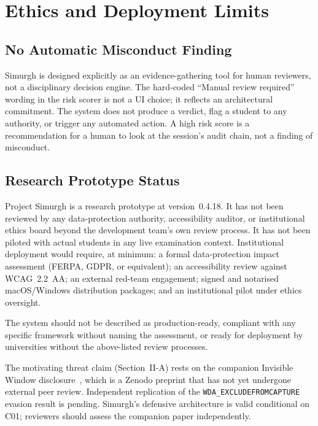 \documentclass[conference]{IEEEtran}
\begin{document}
\section{Ethics and Deployment Limits}

\subsection{No Automatic Misconduct Finding}

Simurgh is designed explicitly as an evidence-gathering tool for human reviewers, not a disciplinary decision engine. The hard-coded ``Manual review required'' wording in the risk scorer is not a UI choice; it reflects an architectural commitment. The system does not produce a verdict, flag a student to any authority, or trigger any automated action. A high risk score is a recommendation for a human to look at the session's audit chain, not a finding of misconduct.

\subsection{Research Prototype Status}

Project Simurgh is a research prototype at version~0.4.18. It has not been reviewed by any data-protection authority, accessibility auditor, or institutional ethics board beyond the development team's own review process. It has not been piloted with actual students in any live examination context. Institutional deployment would require, at minimum: a formal data-protection impact assessment (FERPA, GDPR, or equivalent); an accessibility review against WCAG~2.2~AA; an external red-team engagement; signed and notarised macOS/Windows distribution packages; and an institutional pilot under ethics oversight.

The system should not be described as production-ready, compliant with any specific framework without naming the assessment, or ready for deployment by universities without the above-listed review processes.

The motivating threat claim (Section~II-A) rests on the companion Invisible Window disclosure~\cite{abedini2026invisible}, which is a Zenodo preprint that has not yet undergone external peer review. Independent replication of the \texttt{WDA\_EXCLUDEFROMCAPTURE} evasion result is pending. Simurgh's defensive architecture is valid conditional on C01; reviewers should assess the companion paper independently.
\end{document}
